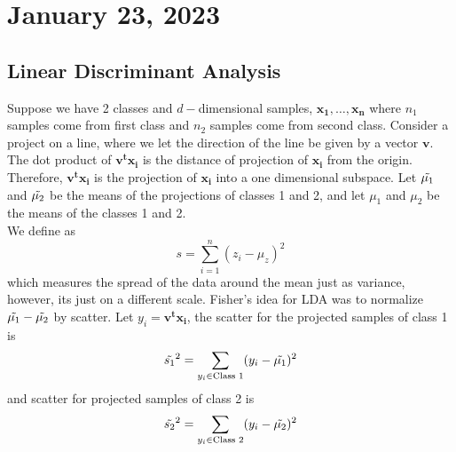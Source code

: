 \section{January 23, 2023}
\subsection{Linear Discriminant Analysis}
Suppose we have 2 classes and  $d-$dimensional samples, $\boldsymbol{x_1, \dots, x_n}$ where $n_1$ samples come from first class and $n_2$ samples come from second class. 
Consider a project on a line, where we let the direction of the line be given by a vector
$\boldsymbol{v}$. The dot product of $\boldsymbol{v^tx_i}$ is the distance of projection 
of $\boldsymbol{x_i}$ from the origin. Therefore, $\boldsymbol{v^tx_i}$ is the projection of $\boldsymbol{x_i}$ into a one dimensional subspace.
Let  $\Tilde{\mu_1}$ and $\Tilde{\mu_2}$ be the means of the projections of classes 1 and 2, and let $\mu_1$ and $\mu_2$ be the means of the classes 1 and 2.
\\
We define  as 
$$
s = \sum_{i=1}^{n} (z_i - \mu_z)^2
$$
which measures the spread of the data around the mean just as variance, however, its just on a different scale. 
Fisher's idea for LDA was to normalize $\Tilde{\mu_1} - \Tilde{\mu_2}$ by scatter. 
Let $y_i = \boldsymbol{v^tx_i}$, the scatter for the projected samples of class 1 is 
$$
\Tilde{s_1}^2 =\sum_{y_i \in \text{Class 1}}(y_i - \Tilde{\mu_1})^2 
$$
and scatter for projected samples of class 2 is
$$
\Tilde{s_2}^2 =\sum_{y_i \in \text{Class 2}}(y_i - \Tilde{\mu_2})^2 
$$